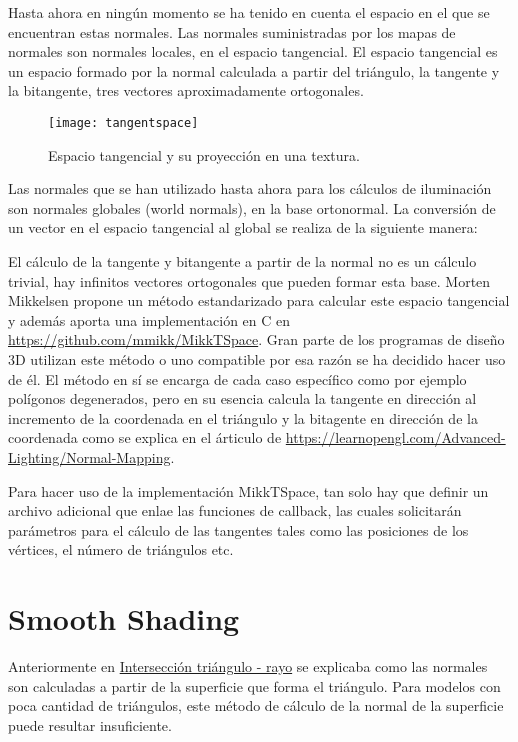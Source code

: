 Hasta ahora en ningún momento se ha tenido en cuenta el espacio en el que se encuentran estas normales. Las normales suministradas por los mapas de normales son normales locales, en el espacio tangencial. El espacio tangencial es un espacio formado por la normal calculada a partir del triángulo, la tangente y la bitangente, tres vectores aproximadamente ortogonales.

\begin{figure}[H]
    \centering
	\texttt{[image: tangentspace]}
	\caption{Espacio tangencial y su proyección en una textura.}
	\label{fig:tangentspace}
\end{figure}
	
Las normales que se han utilizado hasta ahora para los cálculos de iluminación son normales globales (world normals), en la base ortonormal. La conversión de un vector en el espacio tangencial al global se realiza de la siguiente manera: 
	
El cálculo de la tangente y bitangente a partir de la normal no es un cálculo trivial, hay infinitos vectores ortogonales que pueden formar esta base. Morten Mikkelsen \cite{mikkelsen2008simulation} propone un método estandarizado para calcular este espacio tangencial y además aporta una implementación en C en \url{https://github.com/mmikk/MikkTSpace}. Gran parte de los programas de diseño 3D utilizan este método o uno compatible por esa razón se ha decidido hacer uso de él. El método en sí se encarga de cada caso específico como por ejemplo polígonos degenerados, pero en su esencia calcula la tangente en dirección al incremento de la coordenada  en el triángulo y la bitagente en dirección de la coordenada  como se explica en el árticulo de \url{https://learnopengl.com/Advanced-Lighting/Normal-Mapping}.

Para hacer uso de la implementación MikkTSpace, tan solo hay que definir un archivo adicional que enlae las funciones de callback, las cuales solicitarán parámetros para el cálculo de las tangentes tales como las posiciones de los vértices, el número de triángulos etc.

	
\section{Smooth Shading}
	
Anteriormente en \hyperref[subsec:triintersection]{Intersección triángulo - rayo} se explicaba como las normales son calculadas a partir de la superficie que forma el triángulo. Para modelos con poca cantidad de triángulos, este método de cálculo de la normal de la superficie puede resultar insuficiente.
	
